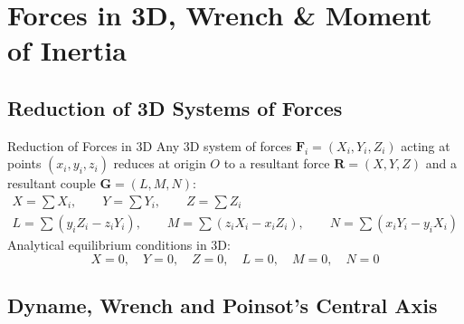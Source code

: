\chapter{Forces in 3D, Wrench \& Moment of Inertia}

\section{Reduction of 3D Systems of Forces}

\begin{theorembox}{Reduction of Forces in 3D}
Any 3D system of forces $\mathbf{F}_i = (X_i, Y_i, Z_i)$ acting at points $(x_i, y_i, z_i)$ reduces at origin $O$ to a resultant force $\mathbf{R} = (X, Y, Z)$ and a resultant couple $\mathbf{G} = (L, M, N)$:
\begin{align}
X = \sum X_i, \qquad Y = \sum Y_i, \qquad Z = \sum Z_i \\
L = \sum (y_i Z_i - z_i Y_i), \qquad M = \sum (z_i X_i - x_i Z_i), \qquad N = \sum (x_i Y_i - y_i X_i)
\end{align}
Analytical equilibrium conditions in 3D:
\begin{equation}
X = 0, \quad Y = 0, \quad Z = 0, \quad L = 0, \quad M = 0, \quad N = 0
\end{equation}
\end{theorembox}

\section{Dyname, Wrench and Poinsot's Central Axis}

